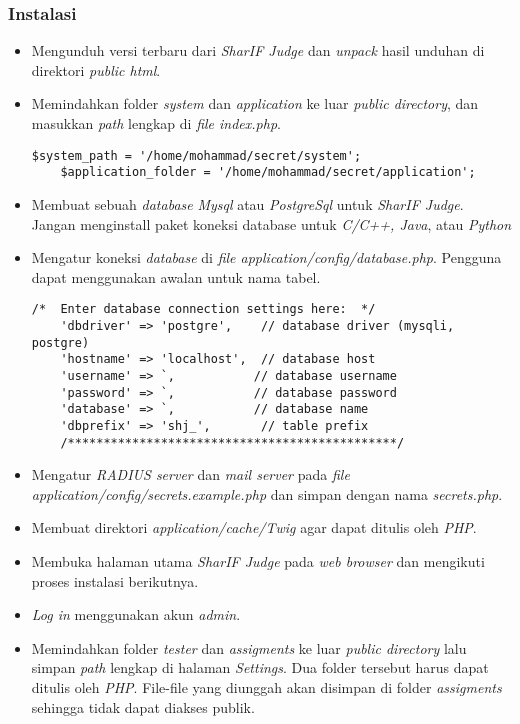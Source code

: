 \subsubsection{Instalasi}
\label{subsubsec:instalasi}
\begin{itemize}
	\item Mengunduh versi terbaru dari \textit{SharIF Judge} dan \textit{unpack} hasil unduhan di direktori \textit{public html}.
	\item Memindahkan folder \textit{system} dan \textit{application} ke luar \textit{public directory}, dan masukkan \textit{path} lengkap di \textit{file index.php}.
	\begin{lstlisting}[basicstyle=\ttfamily, frame=single,
	columns=fullflexible, keepspaces=true, breaklines=true, label=ls:2]
	$system_path = '/home/mohammad/secret/system';
	$application_folder = '/home/mohammad/secret/application';
	\end{lstlisting}
	\item Membuat sebuah \textit{database} \textit{Mysql} atau \textit{PostgreSql} untuk \textit{SharIF Judge}. Jangan menginstall paket koneksi database untuk \textit{C/C++, Java}, atau \textit{Python}
	\item Mengatur koneksi \textit{database} di \textit{file application/config/database.php}. Pengguna dapat
	menggunakan awalan untuk nama tabel.
	\begin{lstlisting}[basicstyle=\ttfamily, frame=single,
	columns=fullflexible, keepspaces=true, breaklines=true, label=ls:3]
	/*  Enter database connection settings here:  */
	'dbdriver' => 'postgre',    // database driver (mysqli, postgre)
	'hostname' => 'localhost',  // database host
	'username' => `,           // database username
	'password' => `,           // database password
	'database' => `,           // database name
	'dbprefix' => 'shj_',       // table prefix
	/**********************************************/
	\end{lstlisting}
	\item Mengatur \textit{RADIUS server} dan \textit{mail server} pada \textit{file application/config/secrets.example.php} dan simpan dengan nama \textit{secrets.php}.
	\item Membuat direktori \textit{application/cache/Twig} agar dapat ditulis oleh \textit{PHP}.
	\item Membuka halaman utama \textit{SharIF Judge} pada \textit{web browser} dan mengikuti proses instalasi berikutnya.
	\item \textit{Log in} menggunakan akun \textit{admin}.
	\item Memindahkan folder \textit{tester} dan \textit{assigments} ke luar \textit{public directory} lalu simpan \textit{path} lengkap di halaman \textit{Settings}. Dua folder tersebut harus dapat ditulis oleh \textit{PHP}. File-file yang diunggah
	akan disimpan di folder \textit{assigments} sehingga tidak dapat diakses publik.
\end{itemize}


